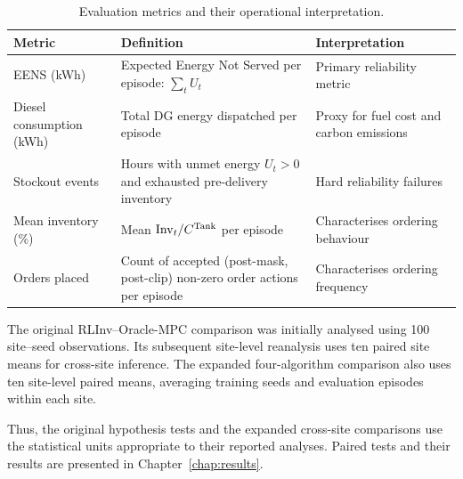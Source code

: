 \begin{table}[htb]
\centering
\small
\caption{Evaluation metrics and their operational interpretation.}
\label{tab:metrics}
\begin{tabular}{lp{4.0cm}p{5.0cm}}
\toprule
\textbf{Metric} & \textbf{Definition} & \textbf{Interpretation} \\
\midrule
EENS (kWh)      & Expected Energy Not Served per episode: $\sum_t U_t$
                & Primary reliability metric \\[4pt]
Diesel consumption (kWh) & Total DG energy dispatched per episode
                & Proxy for fuel cost and carbon emissions \\[4pt]
Stockout events &
Hours with unmet energy $U_t > 0$ and
exhausted pre-delivery inventory
                & Hard reliability failures \\[4pt]
Mean inventory (\%) & Mean $\mathrm{Inv}_t / C^{\mathrm{Tank}}$ per episode
                & Characterises ordering behaviour \\[4pt]
Orders placed   & Count of accepted (post-mask, post-clip) non-zero
                  order actions per episode
                & Characterises ordering frequency \\
\bottomrule
\end{tabular}
\end{table}





The original RLInv--Oracle-MPC comparison
was initially analysed using 100 site--seed
observations. Its subsequent site-level
reanalysis uses ten paired site means for
cross-site inference. The expanded
four-algorithm comparison also uses ten
site-level paired means, averaging training
seeds and evaluation episodes within each site.

Thus, the original hypothesis tests and the
expanded cross-site comparisons use the
statistical units appropriate to their
reported analyses. Paired tests and their
results are presented in
Chapter~\ref{chap:results}.
